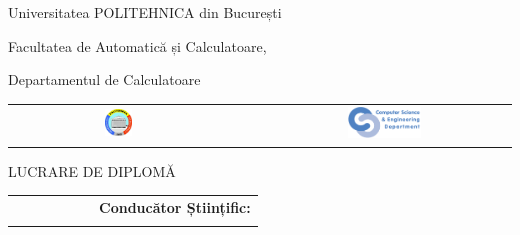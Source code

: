 \begin{titlepage}
	\begin{center}
		{\Large Universitatea POLITEHNICA din București}
		\par\vspace*{2mm}
		{\Large Facultatea de Automatică și Calculatoare,
		
		 Departamentul de Calculatoare}
		\par\vspace*{3mm}
		\begin{table}[h]
        	\begin{center}
				\begin{tabular}{cccc}
                    \includegraphics[width=0.13\textwidth]{src/img/branding/upb}
					& & &
					\includegraphics[width=0.30\textwidth]{src/img/branding/cs}
            	\end{tabular}
			\end{center}
		\end{table}
		
		\par\vspace*{35mm}
		{\Huge LUCRARE DE DIPLOMĂ}
		\par\vspace*{15mm}
		{\Huge \VARtitlero}
		\par\vspace*{15mm}
		{\LARGE \VARauthor}
		\par\vspace*{15mm}
		\begin{table}[h]
        	\begin{center}
			\hskip3.0cm		\begin{tabular}{ccccccr}
					\vspace*{1mm} &&&&&& \Large \textbf{\Large  Conducător Științific:} \\
					 &&&&&& \Large \VARadviser
				\end{tabular}
			\end{center}
		\end{table}

		\par\vspace*{30mm}
		\Large \VARtitlefooterro
	\end{center}
\end{titlepage}
